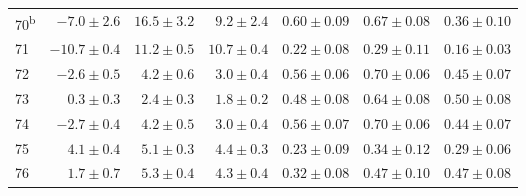 \begin{tabular}{l r r r r r r}
70\textsuperscript{b} & $-7.0 \pm 2.6$ & $16.5 \pm 3.2$ & $9.2 \pm 2.4$ & $0.60 \pm 0.09$ & $0.67 \pm 0.08$ & $0.36 \pm 0.10$ \\ 
71 & $-10.7 \pm 0.4$ & $11.2 \pm 0.5$ & $10.7 \pm 0.4$ & $0.22 \pm 0.08$ & $0.29 \pm 0.11$ & $0.16 \pm 0.03$ \\ 
72 & $-2.6 \pm 0.5$ & $4.2 \pm 0.6$ & $3.0 \pm 0.4$ & $0.56 \pm 0.06$ & $0.70 \pm 0.06$ & $0.45 \pm 0.07$ \\ 
73 & $0.3 \pm 0.3$ & $2.4 \pm 0.3$ & $1.8 \pm 0.2$ & $0.48 \pm 0.08$ & $0.64 \pm 0.08$ & $0.50 \pm 0.08$ \\ 
74 & $-2.7 \pm 0.4$ & $4.2 \pm 0.5$ & $3.0 \pm 0.4$ & $0.56 \pm 0.07$ & $0.70 \pm 0.06$ & $0.44 \pm 0.07$ \\ 
75 & $4.1 \pm 0.4$ & $5.1 \pm 0.3$ & $4.4 \pm 0.3$ & $0.23 \pm 0.09$ & $0.34 \pm 0.12$ & $0.29 \pm 0.06$ \\ 
76 & $1.7 \pm 0.7$ & $5.3 \pm 0.4$ & $4.3 \pm 0.4$ & $0.32 \pm 0.08$ & $0.47 \pm 0.10$ & $0.47 \pm 0.08$ \\ 
\hline 
\end{tabular}
